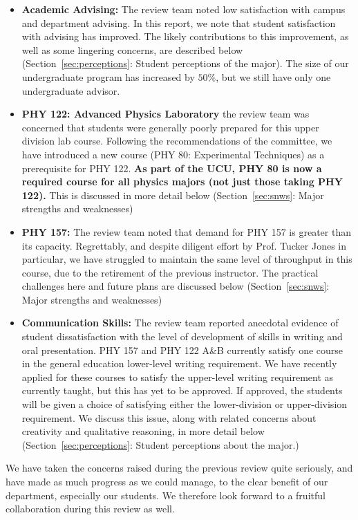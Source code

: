 \documentclass[12pt]{article}
\begin{document}
\begin{itemize}
 \item {\bf Academic Advising:} The review team noted low satisfaction
   with campus and department advising.  In this report, we note that
   student satisfaction with advising has improved.  The likely
   contributions to this improvement, as well as some lingering
   concerns, are described below (Section~\ref{sec:perceptions}:
   Student perceptions of the major).  The size of our undergraduate
   program has increased by $50\%$, but we still have only one
   undergraduate advisor.

 \item {\bf PHY 122: Advanced Physics Laboratory} the review team was
   concerned that students were generally poorly prepared for this
   upper division lab course.  Following the recommendations of the
   committee, we have introduced a new course (PHY 80: Experimental
   Techniques) as a prerequisite for PHY 122.  {\bf As part of the
     UCU, PHY 80 is now a required course for all physics majors (not
     just those taking PHY 122).}  This is discussed in more detail
   below (Section~\ref{sec:snws}: Major strengths and weaknesses)
  
 \item {\bf PHY 157:} The review team noted that demand for PHY 157 is
   greater than its capacity.  Regrettably, and despite diligent
   effort by Prof. Tucker Jones in particular, we have struggled to
   maintain the same level of throughput in this course, due to the
   retirement of the previous instructor.  The practical challenges
   here and future plans are discussed below (Section~\ref{sec:snws}:
   Major strengths and weaknesses)

 \item {\bf Communication Skills:} The review team reported anecdotal
   evidence of student dissatisfaction with the level of development
   of skills in writing and oral presentation.  PHY 157 and PHY 122
   A\&B currently satisfy one course in the general education
   lower-level writing requirement.  We have recently applied for these 
   courses to satisfy the upper-level writing requirement as currently
   taught, but this has yet to be approved.  If approved, the students
   will be given a choice of satisfying either the lower-division or 
   upper-division requirement.  We discuss this
   issue, along with related concerns about creativity and qualitative
   reasoning, in more detail below (Section~\ref{sec:perceptions}:
   Student perceptions about the major.)
\end{itemize}
We have taken the concerns raised during the previous review quite
seriously, and have made as much progress as we could manage, to the
clear benefit of our department, especially our students.  We
therefore look forward to a fruitful collaboration during this review
as well.
\end{document}
